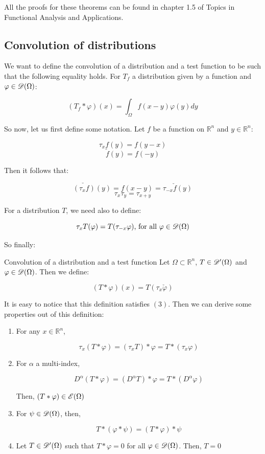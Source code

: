 All the proofs for these theorems can be found in chapter 1.5 of Topics in Functional Analysis and Applications.

\subsection{Convolution of distributions}

We want to define the convolution of a distribution and a test function to be such that the following equality holds. For $T_f$ a distribution given by a function and $\varphi\in\mathscr{D}(\Omega)$:

\begin{equation}
    (T_f\ast\varphi)(x) = \int_{\Omega}f(x-y)\varphi(y)dy
\end{equation}

So now, let us first define some notation. Let $f$ be a function on $\mathbb{R}^n$ and $y\in\mathbb{R}^n$:

\[\tau_xf(y) = f(y-x)\]
\[\check{f}(y) = f(-y)\] 

Then it follows that:

\[\check{(\tau_x{f})}(y) = f(x-y) = \tau_{-x}\check{f}(y)\]
\[\tau_x\tau_y = \tau_{x+y}\]

For a distribution $T$, we need also to define:

\[\tau_{x}T(\varphi) = T(\tau_{-x}\varphi)\text{, for all }\varphi\in\mathscr{D}(\Omega)\]

So finally:

\begin{definition}{Convolution of a distribution and a test function}{}
    Let $\Omega\subset\mathbb{R}^n$, $T\in\mathscr{D}'(\Omega)$ and $\varphi\in\mathscr{D}(\Omega)$. Then we define:

    \[(T\ast\varphi)(x) = T(\tau_{x}\check{\varphi})\]

\end{definition}

It is easy to notice that this definition satisfies $(3)$. Then we can derive some properties out of this definition:

\begin{proposition}{}{}
    \begin{enumerate}
        \item For any $x\in\mathbb{R}^n$, 
        
            \[\tau_x(T\ast\varphi)=(\tau_xT)\ast\varphi=T\ast(\tau_x\varphi)\]
    
        \item For $\alpha$ a multi-index,
        
            \[D^\alpha(T\ast\varphi)=(D^\alpha T)\ast\varphi = T\ast(D^\alpha\varphi)\]

            Then, $(T\ast\varphi)\in\mathscr{E}(\Omega)$
        
        \item For $\psi\in\mathscr{D}(\Omega)$, then,
        
            \[T\ast(\varphi\ast\psi)=(T\ast\varphi)\ast\psi\]

        \item Let $T\in\mathscr{D}'(\Omega)$ such that $T\ast\varphi=0$ for all $\varphi\in\mathscr{D}(\Omega)$. Then, $T=0$
    \end{enumerate}
\end{proposition}

